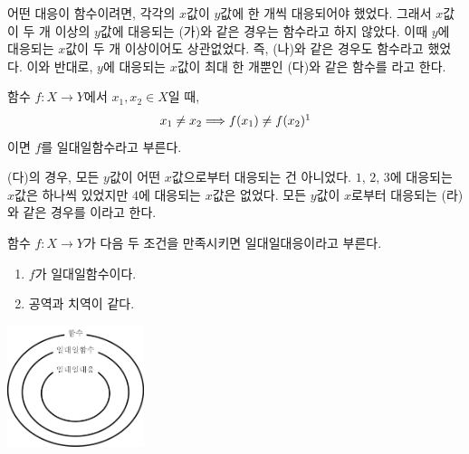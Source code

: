 \documentclass{oblivoir}
\begin{document}
\bigskip
어떤 대응이 함수이려면, 각각의 \(x\)값이 \(y\)값에 한 개씩 대응되어야 했었다.
그래서 \(x\)값이 두 개 이상의 \(y\)값에 대응되는 (가)와 같은 경우는 함수라고 하지 않았다.
이때 \(y\)에 대응되는 \(x\)값이 두 개 이상이어도 상관없었다.
즉, (나)와 같은 경우도 함수라고 했었다.
이와 반대로, \(y\)에 대응되는 \(x\)값이 최대 한 개뿐인 (다)와 같은 함수를 라고 한다.
\begin{mdframed}
%
\label{various1}
함수 \(f:X\to Y\)에서 \(x_1,x_2\in X\)일 때,
\[x_1\neq x_2\Longrightarrow f(x_1)\neq f(x_2)\footnotemark\]
이면 \(f\)를 일대일함수라고 부른다.
\end{mdframed}

\bigskip\bigskip
(다)의 경우, 모든 \(y\)값이 어떤 \(x\)값으로부터 대응되는 건 아니었다.
\(1\), \(2\), \(3\)에 대응되는 \(x\)값은 하나씩 있었지만 \(4\)에 대응되는 \(x\)값은 없었다.
모든 \(y\)값이 \(x\)로부터 대응되는 (라)와 같은 경우를 이라고 한다.
\begin{mdframed}
%
\label{various2}
함수 \(f:X\to Y\)가 다음 두 조건을 만족시키면 일대일대응이라고 부른다.
\begin{enumerate}[label=\roman*)]
\item
\(f\)가 일대일함수이다.
\item
공역과 치역이 같다.
\end{enumerate}
\end{mdframed}
\begin{center}
\includegraphics[width=0.3\textwidth]{various_2}
\end{center}
\end{document}
